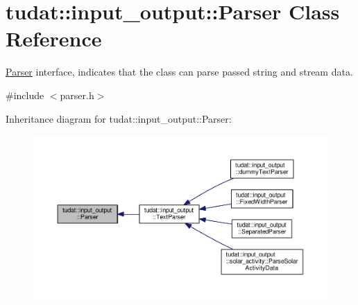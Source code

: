 \hypertarget{classtudat_1_1input__output_1_1Parser}{}\section{tudat\+:\+:input\+\_\+output\+:\+:Parser Class Reference}
\label{classtudat_1_1input__output_1_1Parser}


\hyperlink{classtudat_1_1input__output_1_1Parser}{Parser} interface, indicates that the class can parse passed string and stream data.  




{\ttfamily \#include $<$parser.\+h$>$}



Inheritance diagram for tudat\+:\+:input\+\_\+output\+:\+:Parser\+:
\nopagebreak
\begin{figure}[H]
\begin{center}
\leavevmode
\includegraphics[width=350pt]{classtudat_1_1input__output_1_1Parser__inherit__graph}
\end{center}
\end{figure}
